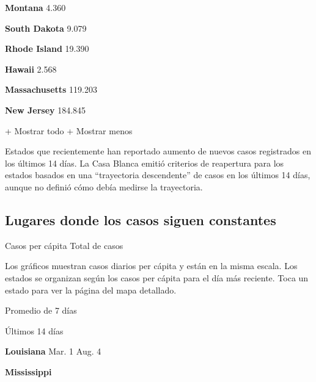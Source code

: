 \textbf{Montana} 4.360

\href{https://www.nytimes.com/interactive/2020/us/south-dakota-coronavirus-cases.html}{}

\textbf{South Dakota} 9.079

\href{https://www.nytimes.com/interactive/2020/us/rhode-island-coronavirus-cases.html}{}

\textbf{Rhode Island} 19.390

\href{https://www.nytimes.com/interactive/2020/us/hawaii-coronavirus-cases.html}{}

\textbf{Hawaii} 2.568

\href{https://www.nytimes.com/interactive/2020/us/massachusetts-coronavirus-cases.html}{}

\textbf{Massachusetts} 119.203

\href{https://www.nytimes.com/interactive/2020/us/new-jersey-coronavirus-cases.html}{}

\textbf{New Jersey} 184.845

+ Mostrar todo + Mostrar menos

Estados que recientemente han reportado aumento de nuevos casos
registrados en los últimos 14 días. La Casa Blanca emitió criterios de
reapertura para los estados basados en una ``trayectoria descendente''
de casos en los últimos 14 días, aunque no definió cómo debía medirse la
trayectoria.

\hypertarget{lugares-donde-los-casos-siguen-constantes}{%
\subsection{Lugares donde los casos siguen
constantes}\label{lugares-donde-los-casos-siguen-constantes}}

Casos per cápita Total de casos

Los gráficos muestran casos diarios per cápita y están en la misma
escala. Los estados se organizan según los casos per cápita para el día
más reciente. Toca un estado para ver la página del mapa detallado.

\href{https://www.nytimes.com/interactive/2020/us/louisiana-coronavirus-cases.html}{}

Promedio de 7 días

Últimos 14 días

\textbf{Louisiana} Mar. 1 Aug. 4

\href{https://www.nytimes.com/interactive/2020/us/mississippi-coronavirus-cases.html}{}

\textbf{Mississippi}

